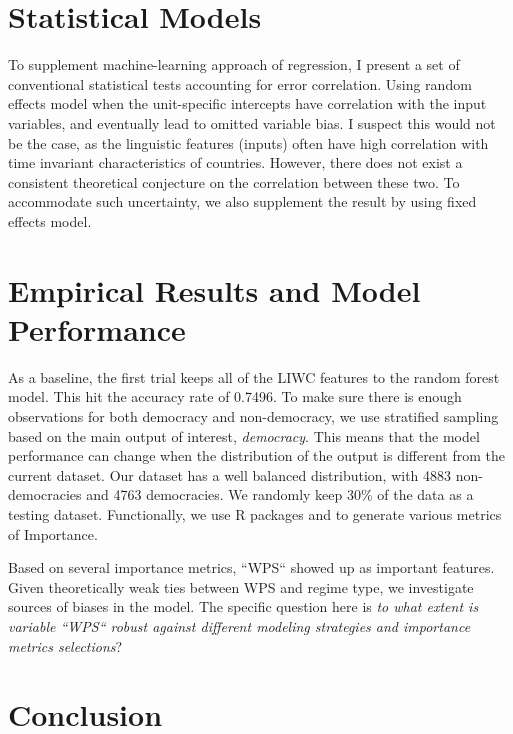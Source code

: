 \documentclass[12pt]{article}
\begin{document}
\section{Statistical Models}
To supplement machine-learning approach of regression, I present a set of conventional statistical tests accounting for error correlation.  Using random effects model when the unit-specific intercepts have correlation with the input variables, and eventually lead to omitted variable bias. I suspect this would not be the case, as the linguistic features (inputs) often have high correlation with time invariant characteristics of countries. However, there does not exist a consistent theoretical conjecture on the correlation between these two. To accommodate such uncertainty, we also supplement the result by using fixed effects model.

\section{Empirical Results and Model Performance}
As a baseline, the first trial keeps all of the LIWC features to the random forest model. This hit the accuracy rate of 0.7496. To make sure there is enough observations for both democracy and non-democracy, we use stratified sampling based on the main output of interest, \textit{democracy}. This means that the model performance can change when the distribution of the output is different from the current dataset. Our dataset has a well balanced distribution, with 4883 non-democracies and 4763 democracies. We randomly keep 30\% of the data as a testing dataset. Functionally, we use R packages \textcite{paluszynska_randomforestexplainer_2020} and \textcite{liaw_classification_2002} to generate various metrics of Importance. 

Based on several importance metrics, ``WPS`` showed up as important features. Given theoretically weak ties between WPS and regime type, we investigate sources of biases in the model. The specific question here is \textit{to what extent is variable ``WPS`` robust against different modeling strategies and importance metrics selections}?

\section{Conclusion}


\begin{appendices}


\end{appendices}

\printbibliography
\end{document}
